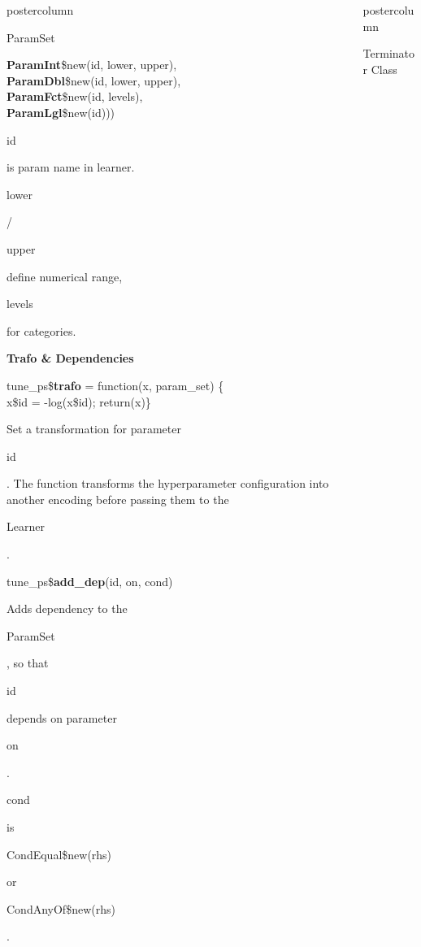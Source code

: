 \documentclass{beamer}
\newlength{\columnheight} %
\newcommand{\codeinline}[1]{\begin{codeboxinline}#1\end{codeboxinline}}
\newcommand{\sectionheading}[1]{{\color{mlrblue}\large\raggedright\textbf{#1}}\vspace{1em}}
\begin{document}
\begin{frame}[fragile]{}
\begin{columns}
\begin{column}{.245\textwidth}
\begin{beamercolorbox}[center]{postercolumn}
\begin{minipage}{.98\textwidth}
{\begin{myblock}{ParamSet}
\begin{codeboxmultiline}[width=20.75cm]
								\hspace*{1ex}\textbf{ParamInt}\$new(id, lower, upper),\\
								\hspace*{1ex}\textbf{ParamDbl}\$new(id, lower, upper),\\
								\hspace*{1ex}\textbf{ParamFct}\$new(id, levels),\\
								\hspace*{1ex}\textbf{ParamLgl}\$new(id)))
							\end{codeboxmultiline}
                            \codeinline{id} is param name in learner. 
                            \codeinline{lower}/\codeinline{upper} define 
                            numerical range, \codeinline{levels} for categories.
                            \vspace{1em}
                            \\ 
                            \sectionheading{Trafo  \& Dependencies}
							\begin{codeboxmultiline}[width=25.5cm]
								tune\_ps\$\textbf{trafo} = function(x, param\_set) \{\\
								\hspace*{1ex}x\$id = -log(x\$id); return(x)\}      
							\end{codeboxmultiline}
							Set a transformation for parameter \codeinline{id}. 
							The function transforms the hyperparameter configuration into another encoding 
							before passing them to the \codeinline{Learner}.
							\\
							\begin{codebox}
								tune\_ps\$\textbf{add\_dep}(id, on, cond)
							\end{codebox}
							Adds dependency to the \codeinline{ParamSet}, 
							so that \codeinline{id} depends on parameter \codeinline{on}.
							\codeinline{cond} is \codeinline{CondEqual\$new(rhs)} or \codeinline{CondAnyOf\$new(rhs)}.
						\end{myblock}
						\vfill}
				\end{minipage}
			\end{beamercolorbox}
		\end{column}
		\begin{column}{.245\textwidth}
			\begin{beamercolorbox}[center]{postercolumn}
				\begin{minipage}{.98\textwidth}
					\parbox[t][\columnheight]{\textwidth}{
						\begin{myblock}{Terminator Class}

\end{myblock}}
\end{minipage}
\end{beamercolorbox}
\end{column}
\end{columns}
\end{frame}
\end{document}
